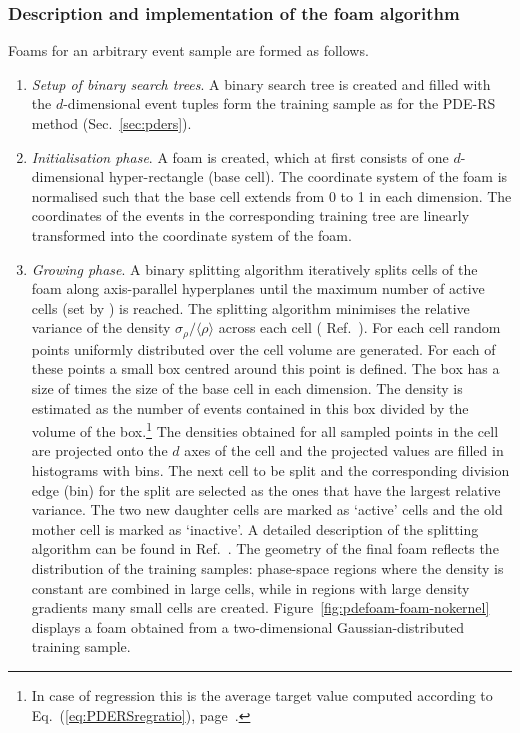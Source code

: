 \subsubsection{Description and implementation of the foam algorithm}
\label{sec:foam-algorithm}
Foams for an arbitrary event sample are formed as follows.

\begin{enumerate}
  \item \emph{Setup of binary search trees}. A binary search tree is
    created and filled with the $d$-dimensional event tuples form the 
    training sample as for the PDE-RS method (\cf Sec.~\ref{sec:pders}).

  \item \emph{Initialisation phase}. A foam is created, which at first
    consists of one $d$-dimensional hyper-rectangle (base cell).  The
    coordinate system of the foam is normalised such that the base
    cell extends from 0 to 1 in each dimension. The coordinates of the
    events in the corresponding training tree are linearly transformed
    into the coordinate system of the foam.

  \item \emph{Growing phase}. A binary splitting algorithm iteratively
    splits cells of the foam along axis-parallel hyperplanes until the maximum
    number of active cells (set by ) is reached.
    The splitting algorithm minimises the relative variance of the
    density $\sigma_{\rho}/\langle\rho\rangle$ across each cell (\cf
    Ref.~\cite{tfoam}).  For each cell  random points
    uniformly distributed over the cell volume are generated. For each
    of these points a small box centred around this point is defined.
    The box has a size of  times the size of the base
    cell in each dimension.  The density is estimated as the number of
    events contained in this box divided by the volume of the box.\footnote
    {
       In case of regression this is the average target value computed 
       according to Eq.~(\ref{eq:PDERSregratio}), page~\pageref{eq:PDERSregratio}.
    }  
    The densities obtained for all sampled points in the cell are
    projected onto the $d$ axes of the cell and the projected values are
    filled in histograms with  bins.  The next cell to be
    split and the corresponding division edge (bin) for the split
    are selected as the ones that have the largest relative variance.
    The two new daughter cells are marked as `active' cells and the
    old mother cell is marked as `inactive'.  A detailed description
    of the splitting algorithm can be found in Ref.~\cite{tfoam}.  The
    geometry of the final foam reflects the distribution of the
    training samples: phase-space regions where the density is
    constant are combined in large cells, while in regions with large
    density gradients many small cells are created. 
    Figure~\ref{fig:pdefoam-foam-nokernel} displays a foam obtained 
    from a two-dimensional Gaussian-distributed training sample.


\end{enumerate}
